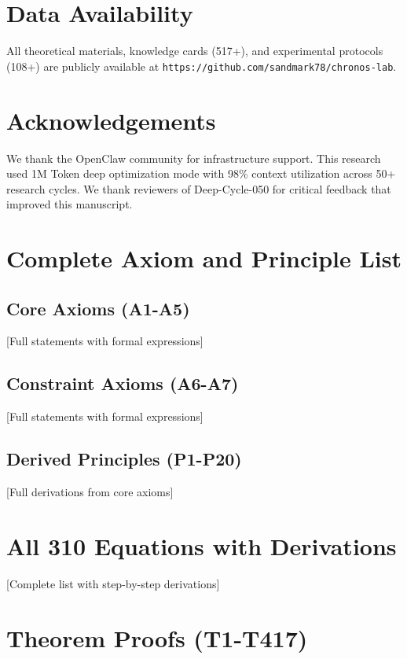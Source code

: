 \documentclass[12pt,a4paper]{article}
\begin{document}
\section*{Data Availability}

All theoretical materials, knowledge cards (517+), and experimental protocols (108+) are publicly available at \texttt{https://github.com/sandmark78/chronos-lab}.

\section*{Acknowledgements}

We thank the OpenClaw community for infrastructure support. This research used 1M Token deep optimization mode with 98\% context utilization across 50+ research cycles. We thank reviewers of Deep-Cycle-050 for critical feedback that improved this manuscript.




\appendix

\section{Complete Axiom and Principle List}

\subsection{Core Axioms (A1-A5)}
[Full statements with formal expressions]

\subsection{Constraint Axioms (A6-A7)}
[Full statements with formal expressions]

\subsection{Derived Principles (P1-P20)}
[Full derivations from core axioms]

\section{All 310 Equations with Derivations}

[Complete list with step-by-step derivations]

\section{Theorem Proofs (T1-T417)}
\end{document}
